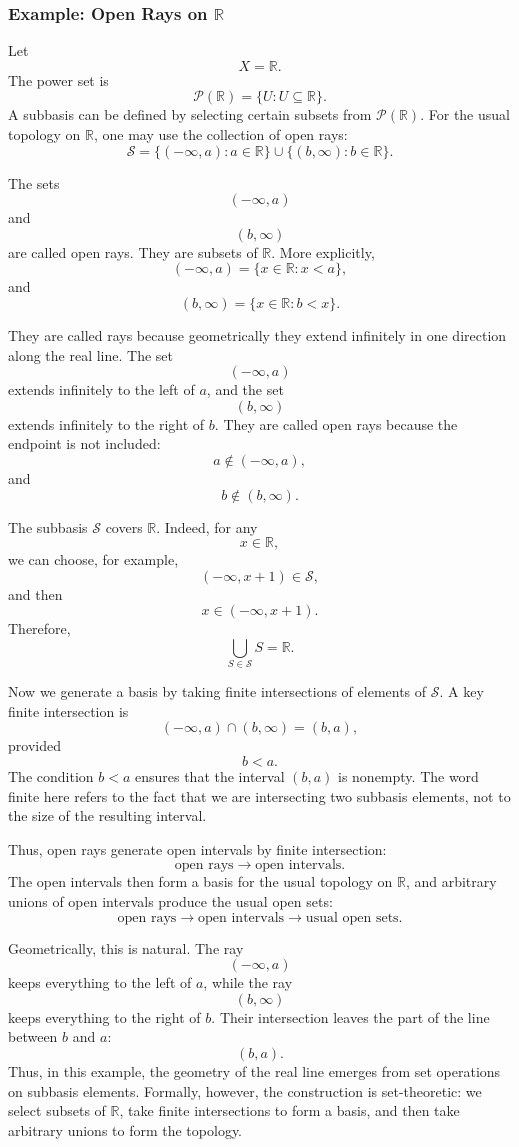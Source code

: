 \documentclass{article}
\begin{document}
	\subsubsection*{Example: Open Rays on \(\mathbb R\)}
	
	Let
	$$
	X=\mathbb R.
	$$
	The power set is
	$$
	\mathcal P(\mathbb R)=\{U:U\subseteq\mathbb R\}.
	$$
	A subbasis can be defined by selecting certain subsets from \(\mathcal P(\mathbb R)\). For the usual topology on \(\mathbb R\), one may use the collection of open rays:
	$$
	\mathcal S
	=
	\{(-\infty,a):a\in\mathbb R\}
	\cup
	\{(b,\infty):b\in\mathbb R\}.
	$$
	
	The sets
	$$
	(-\infty,a)
	$$
	and
	$$
	(b,\infty)
	$$
	are called open rays. They are subsets of \(\mathbb R\). More explicitly,
	$$
	(-\infty,a)=\{x\in\mathbb R:x<a\},
	$$
	and
	$$
	(b,\infty)=\{x\in\mathbb R:b<x\}.
	$$
	
	They are called rays because geometrically they extend infinitely in one direction along the real line. The set
	$$
	(-\infty,a)
	$$
	extends infinitely to the left of \(a\), and the set
	$$
	(b,\infty)
	$$
	extends infinitely to the right of \(b\). They are called open rays because the endpoint is not included:
	$$
	a\notin(-\infty,a),
	$$
	and
	$$
	b\notin(b,\infty).
	$$
	
	The subbasis \(\mathcal S\) covers \(\mathbb R\). Indeed, for any
	$$
	x\in\mathbb R,
	$$
	we can choose, for example,
	$$
	(-\infty,x+1)\in\mathcal S,
	$$
	and then
	$$
	x\in(-\infty,x+1).
	$$
	Therefore,
	$$
	\bigcup_{S\in\mathcal S}S=\mathbb R.
	$$
	
	Now we generate a basis by taking finite intersections of elements of \(\mathcal S\). A key finite intersection is
	$$
	(-\infty,a)\cap(b,\infty)=(b,a),
	$$
	provided
	$$
	b<a.
	$$
	The condition \(b<a\) ensures that the interval \((b,a)\) is nonempty. The word finite here refers to the fact that we are intersecting two subbasis elements, not to the size of the resulting interval.
	
	Thus, open rays generate open intervals by finite intersection:
	$$
	\text{open rays}
	\longrightarrow
	\text{open intervals}.
	$$
	The open intervals then form a basis for the usual topology on \(\mathbb R\), and arbitrary unions of open intervals produce the usual open sets:
	$$
	\text{open rays}
	\longrightarrow
	\text{open intervals}
	\longrightarrow
	\text{usual open sets}.
	$$
	
	Geometrically, this is natural. The ray
	$$
	(-\infty,a)
	$$
	keeps everything to the left of \(a\), while the ray
	$$
	(b,\infty)
	$$
	keeps everything to the right of \(b\). Their intersection leaves the part of the line between \(b\) and \(a\):
	$$
	(b,a).
	$$
	Thus, in this example, the geometry of the real line emerges from set operations on subbasis elements. Formally, however, the construction is set-theoretic: we select subsets of \(\mathbb R\), take finite intersections to form a basis, and then take arbitrary unions to form the topology.
	
\end{document}

